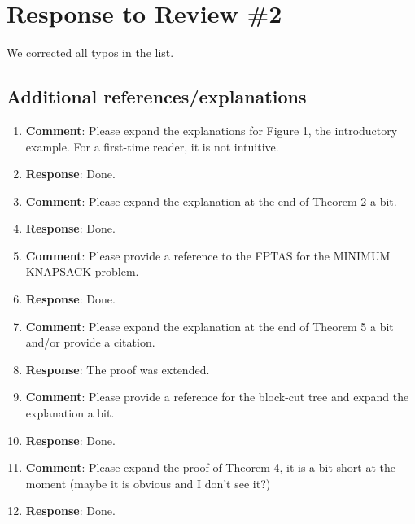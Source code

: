 \documentclass[11pt]{article}
\begin{document}

\newpage

\section*{Response to Review \#2}


We corrected all typos in the list.


\subsection*{Additional references/explanations}

\begin{enumerate}
  
\item \textbf{Comment}: Please expand the explanations for Figure 1,
  the introductory example. For a first-time reader, it is not
  intuitive.

\item[] \textbf{Response}: Done.

\item \textbf{Comment}: Please expand the explanation at the end of
  Theorem 2 a bit.

\item[] \textbf{Response}: Done.
  
\item \textbf{Comment}: Please provide a reference to the FPTAS for
  the MINIMUM KNAPSACK problem.

\item[] \textbf{Response}: Done.

\item \textbf{Comment}: Please expand the explanation at the end of
  Theorem 5 a bit and/or provide a citation.

\item[] \textbf{Response}: The proof was extended.

\item \textbf{Comment}: Please provide a reference for the block-cut
  tree and expand the explanation a bit.

\item[] \textbf{Response}: Done.
  
\item \textbf{Comment}: Please expand the proof of Theorem 4, it is a
  bit short at the moment (maybe it is obvious and I don't see it?)

\item[] \textbf{Response}: Done.
  

\end{enumerate}
\end{document}

